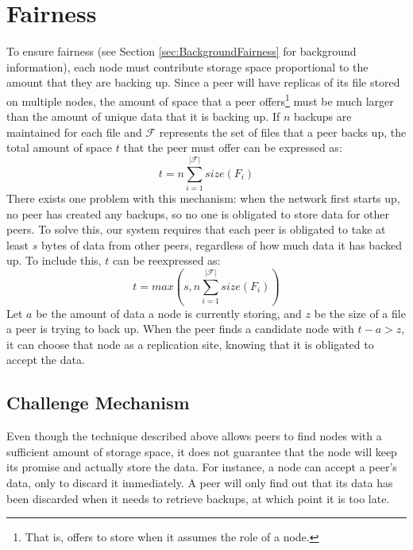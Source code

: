 \documentclass[12pt]{report}
\begin{document}
\section{Fairness} \label{sec:Fairness}
To ensure fairness (see Section \ref{sec:BackgroundFairness} for background information), each node must contribute storage space proportional to the amount that they are backing up. Since a peer will have replicas of its file stored on multiple nodes, the amount of space that a peer offers\footnote{That is, offers to store when it assumes the role of a node.} must be much larger than the amount of unique data that it is backing up. If $n$ backups are maintained for each file and $\mathcal{F}$ represents the set of files that a peer backs up, the total amount of space $t$ that the peer must offer can be expressed as:
\begin{equation}
t=n\sum\limits_{i=1}^{|\mathcal{F}|} size(F_i)
\end{equation}
There exists one problem with this mechanism: when the network first starts up, no peer has created any backups, so no one is obligated to store data for other peers. To solve this, our system requires that each peer is obligated to take at least $s$ bytes of data from other peers, regardless of how much data it has backed up. To include this, $t$ can be reexpressed as:
\begin{equation}
t=max(s,n\sum\limits_{i=1}^{|\mathcal{F}|} size(F_i))
\end{equation}
Let $a$ be the amount of data a node is currently storing, and $z$ be the size of a file a peer is trying to back up. When the peer finds a candidate node with $t - a > z$, it can choose that node as a replication site, knowing that it is obligated to accept the data.

\subsection{Challenge Mechanism} \label{subsec:ChallengeMechanism_sec:Fairness_chap:BTBackup}
Even though the technique described above allows peers to find nodes with a sufficient amount of storage space, it does not guarantee that the node will keep its promise and actually store the data. For instance, a node can accept a peer's data, only to discard it immediately. A peer will only find out that its data has been discarded when it needs to retrieve backups, at which point it is too late.
\end{document}
